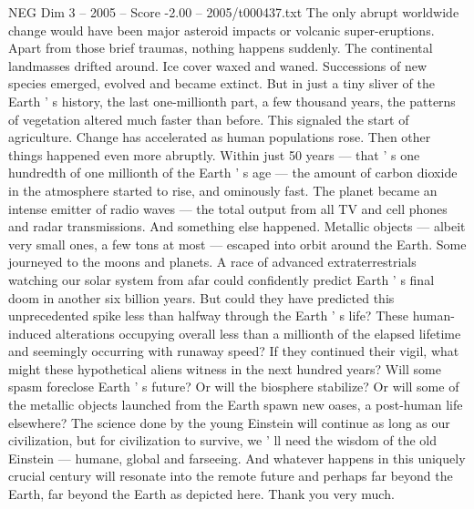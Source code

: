 \begin{textsample}{NEG Dim 3 – 2005 – Score -2.00 – 2005/t000437.txt}
The only abrupt worldwide change would have been major asteroid impacts or volcanic super-eruptions.
Apart from those brief traumas, nothing happens suddenly.
The continental landmasses drifted around.
Ice cover waxed and waned.
Successions of new species emerged, evolved and became extinct.
But in just a tiny sliver of the Earth ' s history, the last one-millionth part, a few thousand years, the patterns of vegetation altered much faster than before.
This signaled the start of agriculture.
Change has accelerated as human populations rose.
Then other things happened even more abruptly.
Within just 50 years — that ' s one hundredth of one millionth of the Earth ' s age — the amount of carbon dioxide in the atmosphere started to rise, and ominously fast.
The planet became an intense emitter of radio waves — the total output from all TV and cell phones and radar transmissions.
And something else happened.
Metallic objects — albeit very small ones, a few tons at most — escaped into orbit around the Earth.
Some journeyed to the moons and planets.
A race of advanced extraterrestrials watching our solar system from afar could confidently predict Earth ' s final doom in another six billion years.
But could they have predicted this unprecedented spike less than halfway through the Earth ' s life?
These human-induced alterations occupying overall less than a millionth of the elapsed lifetime and seemingly occurring with runaway speed?
If they continued their vigil, what might these hypothetical aliens witness in the next hundred years?
Will some spasm foreclose Earth ' s future?
Or will the biosphere stabilize?
Or will some of the metallic objects launched from the Earth spawn new oases, a post-human life elsewhere?
The science done by the young Einstein will continue as long as our civilization, but for civilization to survive, we ' ll need the wisdom of the old Einstein — humane, global and farseeing.
And whatever happens in this uniquely crucial century will resonate into the remote future and perhaps far beyond the Earth, far beyond the Earth as depicted here.
Thank you very much.

\end{textsample}
